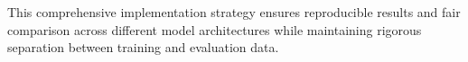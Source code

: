 \documentclass[conference]{IEEEtran}
\begin{document}
This comprehensive implementation strategy ensures reproducible results and fair comparison across different model architectures while maintaining rigorous separation between training and evaluation data.




\end{document}
